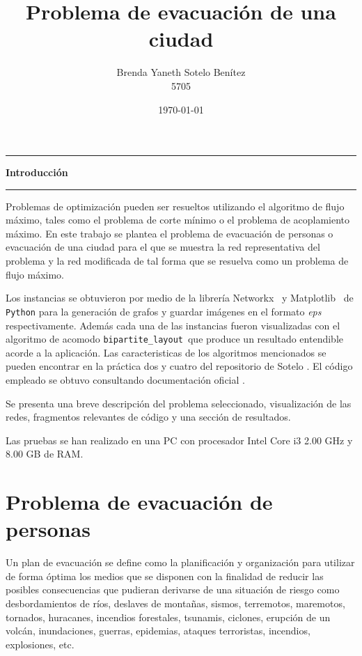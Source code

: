 \documentclass{article}
\title{\textbf{Problema de evacuación de una ciudad}}
\author{Brenda Yaneth Sotelo Benítez \\ 5705}
\date{\today}
\begin{document}
\maketitle

\begin{center}\rule{1.0\textwidth}{0.1mm} \end{center}
\vspace{-1cm}
\begin{center} \Large{\textbf{Introducción}} \end{center}
\vspace{-1cm}
\begin{center}\rule{\textwidth}{0.2mm} \end{center}

Problemas de optimización pueden ser resueltos utilizando el algoritmo de flujo máximo, tales como el problema de corte mínimo o el problema de acoplamiento máximo. En este trabajo se plantea el problema de evacuación de personas o evacuación de una ciudad para el que se muestra la red representativa del problema y la red modificada de tal forma que se resuelva como un problema de flujo máximo.  

Los instancias se obtuvieron por medio de la librería \color{blue}Networkx\color{black}\ \cite{Net} y \color{blue}Matplotlib\color{black}\ \cite{Mat} de \texttt{Python} \cite{Python} para la generación de grafos y guardar imágenes en el formato \textit{eps} respectivamente. Además cada una de las instancias fueron visualizadas con el algoritmo de acomodo
\color{blue}\texttt{bipartite\_layout}\color{black}\ que produce un resultado entendible acorde a la aplicación. Las caracteristicas de los algoritmos mencionados se pueden encontrar en la práctica dos y cuatro del repositorio de Sotelo \cite{BYSB}. El código empleado se obtuvo consultando documentación oficial \cite{network}. 

Se presenta una breve descripción del problema seleccionado, visualización de las redes, fragmentos relevantes de código y una sección de resultados.

Las pruebas se han realizado en una PC con procesador Intel Core i3 2.00 GHz y 8.00 GB de RAM.

\section*{Problema de evacuación de personas}

Un plan de evacuación se define como la planificación y organización para utilizar de forma óptima los medios que se disponen con la finalidad de reducir las posibles consecuencias que pudieran derivarse de una situación de riesgo como desbordamientos de ríos, deslaves de montañas, sismos, terremotos, maremotos, tornados, huracanes, incendios forestales, tsunamis, ciclones, erupción de un volcán, inundaciones, guerras, epidemias, ataques terroristas, incendios, explosiones, etc.
\end{document}
